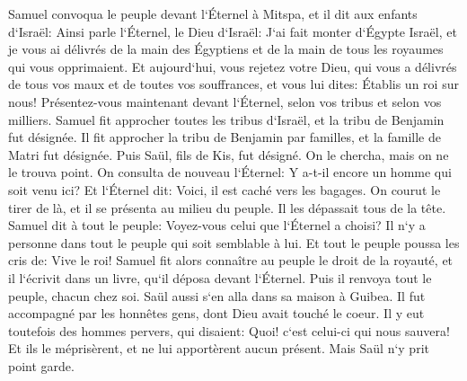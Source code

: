 \verse Samuel convoqua le peuple devant l`Éternel à Mitspa, 
\verse et il dit aux enfants d`Israël: Ainsi parle l`Éternel, le Dieu d`Israël: J`ai fait monter d`Égypte Israël, et je vous ai délivrés de la main des Égyptiens et de la main de tous les royaumes qui vous opprimaient. 
\verse Et aujourd`hui, vous rejetez votre Dieu, qui vous a délivrés de tous vos maux et de toutes vos souffrances, et vous lui dites: Établis un roi sur nous! Présentez-vous maintenant devant l`Éternel, selon vos tribus et selon vos milliers. 
\verse Samuel fit approcher toutes les tribus d`Israël, et la tribu de Benjamin fut désignée. 
\verse Il fit approcher la tribu de Benjamin par familles, et la famille de Matri fut désignée. Puis Saül, fils de Kis, fut désigné. On le chercha, mais on ne le trouva point. 
\verse On consulta de nouveau l`Éternel: Y a-t-il encore un homme qui soit venu ici? Et l`Éternel dit: Voici, il est caché vers les bagages. 
\verse On courut le tirer de là, et il se présenta au milieu du peuple. Il les dépassait tous de la tête. 
\verse Samuel dit à tout le peuple: Voyez-vous celui que l`Éternel a choisi? Il n`y a personne dans tout le peuple qui soit semblable à lui. Et tout le peuple poussa les cris de: Vive le roi! 
\verse Samuel fit alors connaître au peuple le droit de la royauté, et il l`écrivit dans un livre, qu`il déposa devant l`Éternel. Puis il renvoya tout le peuple, chacun chez soi. 
\verse Saül aussi s`en alla dans sa maison à Guibea. Il fut accompagné par les honnêtes gens, dont Dieu avait touché le coeur. 
\verse Il y eut toutefois des hommes pervers, qui disaient: Quoi! c`est celui-ci qui nous sauvera! Et ils le méprisèrent, et ne lui apportèrent aucun présent. Mais Saül n`y prit point garde. 

\chapter{}

